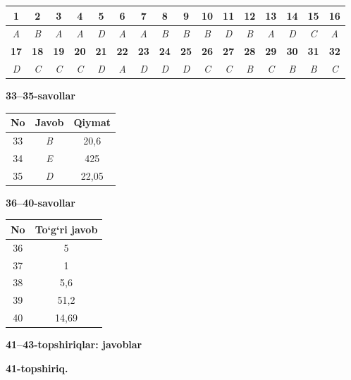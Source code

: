 \documentclass[11pt,a4paper]{article}
\begin{document}
\noindent\begin{tabular}{|c|c|c|c|c|c|c|c|c|c|c|c|c|c|c|c|}\hline
\textbf{1} & \textbf{2} & \textbf{3} & \textbf{4} & \textbf{5} & \textbf{6} & \textbf{7} & \textbf{8} & \textbf{9} & \textbf{10} & \textbf{11} & \textbf{12} & \textbf{13} & \textbf{14} & \textbf{15} & \textbf{16}\\\hline
\textsl{A} & \textsl{B} & \textsl{A} & \textsl{A} & \textsl{D} & \textsl{A} & \textsl{A} & \textsl{B} & \textsl{B} & \textsl{B} & \textsl{D} & \textsl{B} & \textsl{A} & \textsl{D} & \textsl{C} & \textsl{A}\\\hline
\textbf{17} & \textbf{18} & \textbf{19} & \textbf{20} & \textbf{21} & \textbf{22} & \textbf{23} & \textbf{24} & \textbf{25} & \textbf{26} & \textbf{27} & \textbf{28} & \textbf{29} & \textbf{30} & \textbf{31} & \textbf{32}\\\hline
\textsl{D} & \textsl{C} & \textsl{C} & \textsl{C} & \textsl{D} & \textsl{A} & \textsl{D} & \textsl{D} & \textsl{D} & \textsl{C} & \textsl{C} & \textsl{B} & \textsl{C} & \textsl{B} & \textsl{B} & \textsl{C}\\\hline
\end{tabular}\par\medskip
\noindent\textbf{33--35-savollar}\par\smallskip
\noindent\begin{tabular}{|c|c|c|}\hline \textbf{No} & \textbf{Javob} & \textbf{Qiymat}\\\hline
33 & \textsl{B} & 20,6\\\hline
34 & \textsl{E} & 425\\\hline
35 & \textsl{D} & 22,05\\\hline
\end{tabular}\par\medskip
\noindent\textbf{36--40-savollar}\par\smallskip
\noindent\begin{tabular}{|c|c|}\hline \textbf{No} & \textbf{To`g`ri javob}\\\hline
36 & 5\\\hline
37 & 1\\\hline
38 & 5,6\\\hline
39 & 51,2\\\hline
40 & 14,69\\\hline
\end{tabular}\par\medskip
\noindent\textbf{41--43-topshiriqlar: javoblar}\par\smallskip
\noindent\textbf{41-topshiriq.}\par
\end{document}
